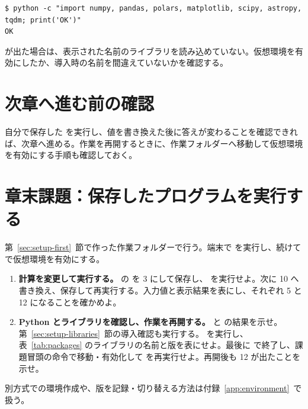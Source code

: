\begin{lstlisting}[numbers=none, xleftmargin=2\zw]
$ python -c "import numpy, pandas, polars, matplotlib, scipy, astropy, tqdm; print('OK')"
OK
\end{lstlisting}

 が出た場合は、表示された名前のライブラリを読み込めていない。仮想環境を有効にしたか、導入時の名前を間違えていないかを確認する。

\section{次章へ進む前の確認}

自分で保存した  を実行し、値を書き換えた後に答えが変わることを確認できれば、次章へ進める。作業を再開するときに、作業フォルダーへ移動して仮想環境を有効にする手順も確認しておく。

\section{章末課題：保存したプログラムを実行する}

第~\ref{sec:setup-first}~節で作った作業フォルダーで行う。端末で  を実行し、続けて  で仮想環境を有効にする。

\begin{enumerate}
\item \textbf{計算を変更して実行する。}
 の  を 3 にして保存し、 を実行せよ。次に 10 へ書き換え、保存して再実行する。入力値と表示結果を表にし、それぞれ 5 と 12 になることを確かめよ。

\item \textbf{Python とライブラリを確認し、作業を再開する。}
 と  の結果を示せ。第~\ref{sec:setup-libraries}~節の導入確認も実行する。 を実行し、表~\ref{tab:packages} のライブラリの名前と版を表にせよ。最後に  で終了し、課題冒頭の命令で移動・有効化して  を再実行せよ。再開後も 12 が出たことを示せ。

\end{enumerate}

別方式での環境作成や、版を記録・切り替える方法は付録~\ref{app:environment}~で扱う。
